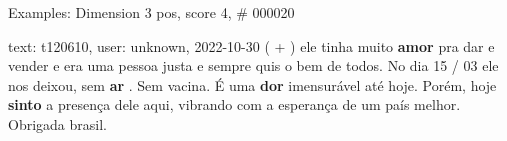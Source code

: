 \begin{frame}{Examples: Dimension 3 pos, score 4, \# 000020}
\footnotesize
\begin{exampleblock}{text: t120610, user: unknown, 2022-10-30}
( + ) ele tinha muito \textbf{amor} pra dar e vender e era uma pessoa justa e 
sempre quis o bem de todos. No dia 15 / 03 ele nos deixou, sem \textbf{ar} . 
Sem vacina. É uma \textbf{dor} imensurável até hoje. Porém, hoje \textbf{sinto} 
a presença dele aqui, vibrando com a esperança de um país melhor. Obrigada 
brasil. 
\end{exampleblock}
\end{frame}
